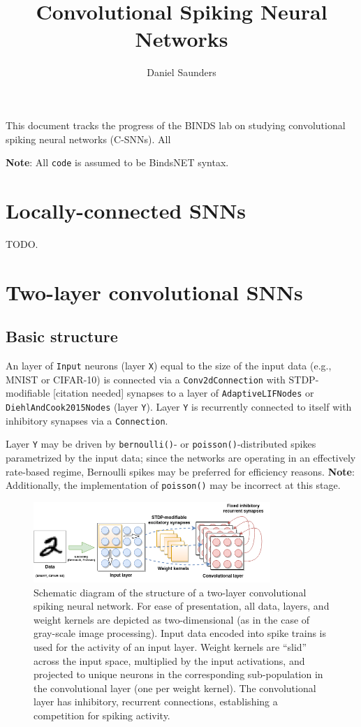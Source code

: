 \documentclass{article}
\title{Convolutional Spiking Neural Networks}
\author{Daniel Saunders}
\begin{document}
\maketitle

This document tracks the progress of the BINDS lab on studying convolutional spiking neural networks (C-SNNs). All 

\textbf{Note}: All \texttt{code} is assumed to be BindsNET syntax.

\section{Locally-connected SNNs}

TODO.

\section{Two-layer convolutional SNNs}

\subsection{Basic structure}

An layer of \texttt{Input} neurons (layer \texttt{X}) equal to the size of the input data (e.g., MNIST or CIFAR-10) is connected via a \texttt{Conv2dConnection} with STDP-modifiable [citation needed] synapses to a layer of \texttt{AdaptiveLIFNodes} or \texttt{DiehlAndCook2015Nodes} (layer \texttt{Y}). Layer \texttt{Y} is recurrently connected to itself with inhibitory synapses via a \texttt{Connection}.

Layer \texttt{Y} may be driven by \texttt{bernoulli()}- or \texttt{poisson()}-distributed spikes parametrized by the input data; since the networks are operating in an effectively rate-based regime, Bernoulli spikes may be preferred for efficiency reasons. \textbf{Note}: Additionally, the implementation of \texttt{poisson()} may be incorrect at this stage.

\begin{figure}[h]
	\centering
	\includegraphics[width=0.8\textwidth]{two_layer_convolutional_snn.png}
	\caption{Schematic diagram of the structure of a two-layer convolutional spiking neural network. For ease of presentation, all data, layers, and weight kernels are depicted as two-dimensional (as in the case of gray-scale image processing). Input data encoded into spike trains is used for the activity of an input layer. Weight kernels are ``slid'' across the input space, multiplied by the input activations, and projected to unique neurons in the corresponding sub-population in the convolutional layer (one per weight kernel). The convolutional layer has inhibitory, recurrent connections, establishing a competition for spiking activity.}
\end{figure}
\end{document}
